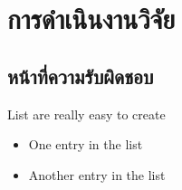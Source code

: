 \chapter{การดำเนินงานวิจัย}

\section{หน้าที่ความรับผิดชอบ}
List are really easy to create
 
\begin{itemize}
  \item One entry in the list
  \item Another entry in the list
\end{itemize}
